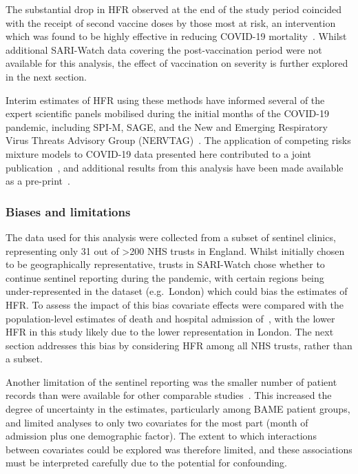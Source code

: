 The substantial drop in HFR observed at the end of the study period coincided with the receipt of second vaccine doses by those most at risk, an intervention which was found to be highly effective in reducing COVID-19 mortality~\parencite{Lopez_Bernal2021-gt}. Whilst additional SARI-Watch data covering the post-vaccination period were not available for this analysis, the effect of vaccination on severity is further explored in the next section.

Interim estimates of HFR using these methods have informed several of the expert scientific panels mobilised during the initial months of the COVID-19 pandemic, including SPI-M, SAGE, and the New and Emerging Respiratory Virus Threats Advisory Group (NERVTAG)~\parencite{Govuk2020-re, Govuk2020-ga, Govuk2020-lb}. The application of competing risks mixture models to COVID-19 data presented here contributed to a joint publication~\parencite{Jackson2022-lt}, and additional results from this analysis have been made available as a pre-print~\parencite{Kirwan2021-sw}.

\subsubsection{Biases and limitations}

The data used for this analysis were collected from a subset of sentinel clinics, representing only 31 out of >200 NHS trusts in England. Whilst initially chosen to be geographically representative, trusts in SARI-Watch chose whether to continue sentinel reporting during the pandemic, with certain regions being under-represented in the dataset (e.g.\ London) which could bias the estimates of HFR\@. To assess the impact of this bias covariate effects were compared with the population-level estimates of death and hospital admission of~\cite{Williamson2020-xk}, with the lower HFR in this study likely due to the lower representation in London. The next section addresses this bias by considering HFR among all NHS trusts, rather than a subset.

Another limitation of the sentinel reporting was the smaller number of patient records than were available for other comparable studies~\parencite{Ferrando-Vivas2021-ut, Docherty2021-es}. This increased the degree of uncertainty in the estimates, particularly among BAME patient groups, and limited analyses to only two covariates for the most part (month of admission plus one demographic factor). The extent to which interactions between covariates could be explored was therefore limited, and these associations must be interpreted carefully due to the potential for confounding.

